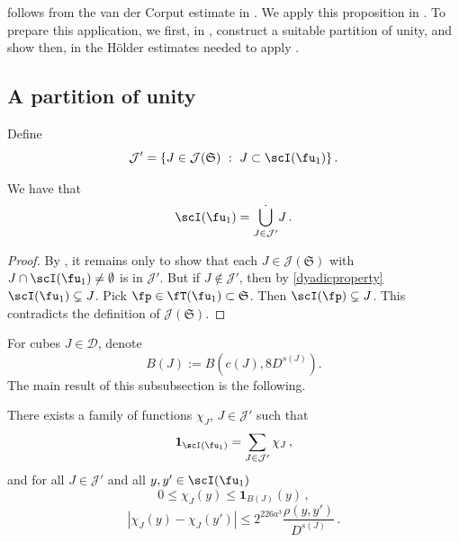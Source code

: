  follows from the van der Corput estimate in . We apply this proposition in . To prepare this application, we first, in , construct a suitable partition of unity, and show then, in  the H\"older estimates needed to apply .

\subsection{A partition of unity}
\label{subsubsec-pao}
    Define
    $$
        \mathcal{J}' = \{J \in \mathcal{J}(\mathfrak{S}) \ : \ J \subset \scI(\fu_1)\}\,.
    $$

    \begin{lemma}
        \label{dyadic-partition-1}
        \leanok
        We have that
        $$
            \scI(\fu_1) = \dot{\bigcup_{J \in \mathcal{J}'}} J\,.
        $$
    \end{lemma}

    \begin{proof}
        By , it remains only to show that each $J \in \mathcal{J}(\mathfrak{S})$ with $J \cap \scI(\fu_1) \ne \emptyset$ is in $\mathcal{J}'$. But if $J \notin \mathcal{J}'$, then by \eqref{dyadicproperty} $\scI(\fu_1) \subsetneq J$. Pick $\fp \in \fT(\fu_1) \subset \mathfrak{S}$. Then $\scI(\fp) \subsetneq J$. This contradicts the definition of $\mathcal{J}(\mathfrak{S})$.
    \end{proof}

    For cubes $J \in \mathcal{D}$, denote
    \begin{equation}
        \label{def-BJ}
        B(J) := B(c(J), 8D^{s(J)}).
    \end{equation}
    The main result of this subsubsection is the following.

    \begin{lemma}
        \label{Lipschitz-partition-unity}
        \leanok
        There exists a family of functions $\chi_J$, $J \in \mathcal{J}'$ such that \begin{equation}
            \label{eq-pao-1}
            \mathbf{1}_{\scI(\fu_1)} = \sum_{J \in \mathcal{J}'} \chi_J\,,
        \end{equation}
        and for all $J \in \mathcal{J}'$ and all $y,y' \in \scI(\fu_1)$
      \begin{equation}
            \label{eq-pao-2}
            0 \leq \chi_J(y) \leq \mathbf{1}_{B(J)}(y)\,,
        \end{equation}
      \begin{equation}
            \label{eq-pao-3}
            |\chi_J(y) - \chi_J(y')| \le 2^{226a^3} \frac{\rho(y,y')}{D^{s(J)}}\,.
        \end{equation}
    \end{lemma}

